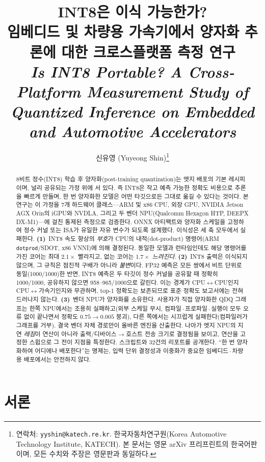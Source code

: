 \documentclass[11pt]{article}
\title{INT8은 이식 가능한가?\\[2pt]
\large 임베디드 및 차량용 가속기에서 양자화 추론에 대한 크로스플랫폼 측정 연구\\[6pt]
\normalsize\textit{Is INT8 Portable? A Cross-Platform Measurement Study of\\
Quantized Inference on Embedded and Automotive Accelerators}}
\author{신유영 (Yuyeong Shin)\thanks{연락처: \texttt{yyshin@katech.re.kr}. 한국자동차연구원(Korea Automotive Technology Institute, KATECH). 본 문서는 영문 arXiv 프리프린트의 한국어판이며, 모든 수치와 주장은 영문판과 동일하다.}}
\date{}
\begin{document}
\maketitle

\begin{abstract}
8비트 정수(INT8) 학습 후 양자화(post-training quantization)는 엣지 배포의 기본 레시피이며, 널리 공유되는 가정 위에 서 있다. 즉 INT8은 작고 예측 가능한 정확도 비용으로 추론을 빠르게 만들며, 한 번 양자화한 모델은 어떤 타깃으로든 그대로 옮길 수 있다는 것이다. 본 연구는 이 가정을 7개 하드웨어 클래스---ARM 및 x86 CPU, 외장 GPU, NVIDIA Jetson AGX Orin의 iGPU와 NVDLA, 그리고 두 벤더 NPU(Qualcomm Hexagon HTP, DEEPX DX-M1)---에 걸친 통제된 측정으로 검증한다. ONNX 아티팩트와 양자화 스케일을 고정하여 정수 커널 또는 ISA가 유일한 자유 변수가 되도록 설계했다. 이식성은 세 축 모두에서 실패한다. \textbf{(1)}~INT8 속도 향상의 \emph{부호}가 CPU의 내적(dot-product) 명령어(ARM \texttt{dotprod}/SDOT, x86 VNNI)에 의해 결정된다. 동일한 모델과 런타임인데도 해당 명령어를 가진 코어는 최대 $2.1\times$ 빨라지고, 없는 코어는 $1.7\times$ \emph{느려진다}. \textbf{(2)}~INT8 출력은 이식되지 않으며, 그 규칙은 점진적 구배가 아니라 \emph{불변}이다. FP32 예측은 모든 쌍에서 비트 단위로 동일(1000/1000)한 반면, INT8 예측은 두 타깃이 정수 커널을 공유할 때 정확히 1000/1000, 공유하지 않으면 958--965/1000으로 갈린다. 이는 경계가 CPU$\leftrightarrow$CPU인지 CPU$\leftrightarrow$가속기인지와 무관하며, top-1 정확도는 보존되므로 표준 정확도 보고서에는 전혀 드러나지 않는다. \textbf{(3)}~벤더 NPU가 양자화를 소유한다. 사용자가 직접 양자화한 QDQ 그래프는 한쪽 NPU에서는 조용히 실패하고(외부 스케일 무시, 컴파일\,$\cdot$\,프로파일\,$\cdot$\,실행이 모두 오류 없이 끝나면서 정확도 $0.75 \rightarrow 0.005$ 붕괴), 다른 쪽에서는 시끄럽게 실패한다(컴파일러가 그래프를 거부). 결국 벤더 자체 경로만이 올바른 엔진을 산출한다. 나아가 엣지 NPU의 지연 \emph{레짐}이 연산이 아니라 출력/디바이스$\rightarrow$호스트 전송 크기로 결정됨을 보이고, 연산을 고정한 스윕으로 그 전이 지점을 특정한다. 스크립트와 32건의 리포트를 공개한다. ``한 번 양자화하여 어디에나 배포한다''는 명제는, 입력 단위 결정성과 이중화가 중요한 임베디드\,$\cdot$\,차량용 배포에서는 안전하지 않다.
\end{abstract}

\section{서론}
\end{document}
